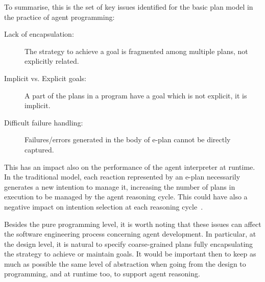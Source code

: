 
\bigskip

To summarise, this is the set of key issues identified for the basic
plan model in the practice of agent programming:
%
\begin{description}
%
\item[Lack of encapsulation:] The strategy to achieve a goal is
  fragmented among multiple plans, not explicitly related.
%
\item[Implicit vs. Explicit goals:] A part of the plans in a program
  have a goal which is not explicit, it is implicit.
%
\item[Difficult failure handling:] Failures/errors generated in the
  body of e-plan cannot be directly captured.
%
\end{description}

\noindent This has an impact also on the performance of the agent
interpreter at runtime. In the traditional model, each reaction
represented by an e-plan necessarily generates a new intention to
manage it, increasing the number of plans in execution to be managed
by the agent reasoning cycle.
%
This could have also a negative impact on intention selection at
each reasoning cycle~\cite{DBLP:conf/atal/LoganTY17}.

%


Besides the pure programming level, it is worth noting that these
issues can affect the %
software engineering process concerning
agent development.
In particular, at the design level, it is natural to specify
coarse-grained plans fully encapsulating the strategy to achieve or
maintain goals.
%
It would be important then to keep as much as possible the same level
of abstraction when going from the design to programming, and at
runtime too, to support agent reasoning.


%
%


